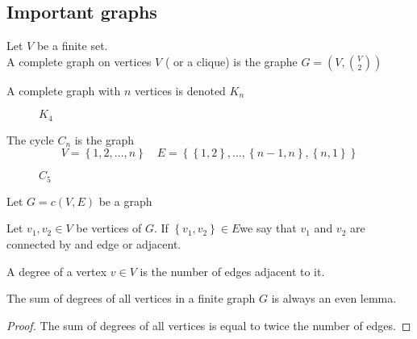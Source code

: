 \documentclass[../main.tex]{subfiles}
\begin{document}
\subsection{Important graphs}
\begin{defn}
	Let $V$ be a finite set.\\
	A complete graph on vertices $V$ (  or a clique) is the graphe $G = ( V, \binom V 2) $
\end{defn}
A complete graph with $n $ vertices is denoted $K_n$ 
\begin{figure}[H]
    \centering
    \caption{$K_4$}
    \label{fig:k4}
\end{figure}
\begin{defn}
	The cycle $C_n$ is the graph
	\[ 
	V = \left\{ 1,2,\ldots,n \right\} \quad E= \left\{ \left\{ 1,2 \right\} , \ldots, \left\{ n-1,n \right\} , \left\{ n,1 \right\}  \right\} 
	\]
	
\end{defn}
\begin{figure}[H]
    \centering
    \caption{ $C_5$}
    \label{fig:c5}
\end{figure}
Let $G= c( V,E) $ be a graph
\begin{defn}
	Let $v_1,v_2\in V$ be vertices of $G$. If $ \left\{ v_1,v_2 \right\} \in E$we say that $v_1$ and $v_2$ are connected by and edge or adjacent.
\end{defn}
\begin{defn}
	A degree of a vertex $v \in V$ is the number of edges adjacent to it.
\end{defn}
\begin{lemma}
	The sum of degrees of all vertices in a finite graph $G$ is always an even lemma.
\end{lemma}
\begin{proof}
The sum of degrees of all vertices is equal to twice the number of edges.
\end{proof}
\end{document}
